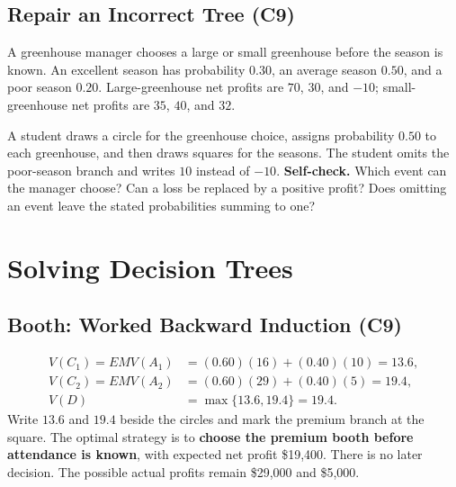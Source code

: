 \subsection{Repair an Incorrect Tree (C9)}\label{sec:repair}
A greenhouse manager chooses a large or small greenhouse before the season is known. An excellent season has probability $0.30$, an average season $0.50$, and a poor season $0.20$. Large-greenhouse net profits are $70$, $30$, and $-10$; small-greenhouse net profits are $35$, $40$, and $32$.

A student draws a circle for the greenhouse choice, assigns probability $0.50$ to each greenhouse, and then draws squares for the seasons. The student omits the poor-season branch and writes $10$ instead of $-10$.
\label{task:repair}
\textbf{Self-check.} Which event can the manager choose? Can a loss be replaced by a positive profit? Does omitting an event leave the stated probabilities summing to one?

\section{Solving Decision Trees}\label{sec:solving}

\subsection{Booth: Worked Backward Induction (C9)}\label{sec:solve-booth}
\label{task:solve-booth}
\begin{align*}
V(C_1)=EMV(A_1)&=(0.60)(16)+(0.40)(10)=13.6,\\
V(C_2)=EMV(A_2)&=(0.60)(29)+(0.40)(5)=19.4,\\
V(D)&=\max\{13.6,19.4\}=19.4.
\end{align*}
Write $13.6$ and $19.4$ beside the circles and mark the premium branch at the square. The optimal strategy is to \textbf{choose the premium booth before attendance is known}, with expected net profit \$19,400. There is no later decision. The possible actual profits remain \$29,000 and \$5,000.

